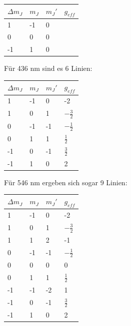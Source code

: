 \begin{center}
  \begin{tabular}{|p{2cm}|p{2cm}|p{2cm}|p{2cm}|}
    \hline
    $\Delta m_J$ & $m_J$ & $m_J'$ & $g_{eff}$ \\ \hline
    1               & -1               & 0 &  \\ \hline
    0               & 0                & 0 &  \\ \hline
    -1              & 1                & 0 &  \\ \hline
	\end{tabular}
\end{center}

Für 436 nm sind es 6 Linien:

\begin{center}
  \begin{tabular}{|p{2cm}|p{2cm}|p{2cm}|p{2cm}|}
    \hline
    $\Delta m_J$ & $m_J$ & $m_J'$ & $g_{eff}$ \\ \hline
    1               & -1               & 0 & -2 \\ \hline
    1               & 0                & 1 & $-\frac{3}{2}$ \\ \hline
    0               & -1               & -1 & $-\frac{1}{2}$ \\ \hline
    0               & 1                & 1 & $\frac{1}{2}$ \\ \hline
   -1               & 0                & -1 & $\frac{3}{2}$ \\ \hline    
   -1               & 1                & 0 & 2 \\ \hline
    \end{tabular}
\end{center}

Für 546 nm ergeben sich sogar 9 Linien:

\begin{center}
  \begin{tabular}{|p{2cm}|p{2cm}|p{2cm}|p{2cm}|}
    \hline
    $\Delta m_J$ & $m_J$ & $m_J'$ & $g_{eff}$ \\ \hline
    1               & -1               & 0 & -2 \\ \hline
    1               & 0                & 1 & $-\frac{3}{2}$ \\ \hline
    1               & 1                & 2 & -1 \\ \hline
    0               & -1               & -1 & $-\frac{1}{2}$ \\ \hline
    0               & 0                & 0 & 0 \\ \hline
    0               & 1                & 1 & $\frac{1}{2}$ \\ \hline
    -1              & -1               & -2 & 1 \\ \hline
    -1              & 0                & -1 & $\frac{3}{2}$ \\ \hline
    -1              & 1                & 0 & 2 \\ \hline
    \end{tabular}
\end{center}

